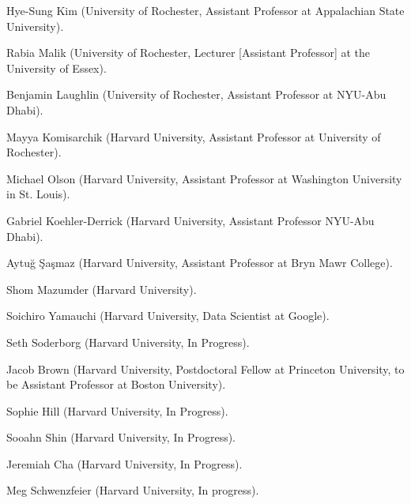 \documentclass[11pt,article,oneside]{memoir}
\begin{document}
\begin{cvlist}
  \begin{cvlist}
\item Hye-Sung Kim (University of Rochester, Assistant Professor at Appalachian State University).
\item Rabia Malik (University of Rochester, Lecturer [Assistant Professor] at the University of Essex).
\item Benjamin Laughlin (University of Rochester, Assistant Professor at NYU-Abu Dhabi).
\item Mayya Komisarchik (Harvard University, Assistant Professor at University of Rochester).
\item Michael Olson (Harvard University, Assistant Professor at Washington University in St. Louis).
\item Gabriel Koehler-Derrick (Harvard University, Assistant Professor NYU-Abu Dhabi).
\item Aytu\u{g} \c{S}a\c{s}maz (Harvard University, Assistant Professor at Bryn Mawr College).
\item Shom Mazumder (Harvard University).
\item Soichiro Yamauchi (Harvard University, Data Scientist at Google).
\item Seth Soderborg (Harvard University, In Progress).
\item Jacob Brown (Harvard University, Postdoctoral Fellow at Princeton University, to be Assistant Professor at Boston University).
\item Sophie Hill (Harvard University, In Progress).
\item Sooahn Shin (Harvard University, In Progress).
\item Jeremiah Cha (Harvard University, In Progress).
\item Meg Schwenzfeier (Harvard University, In progress). 
\end{cvlist} 


\end{cvlist}
\end{document}
